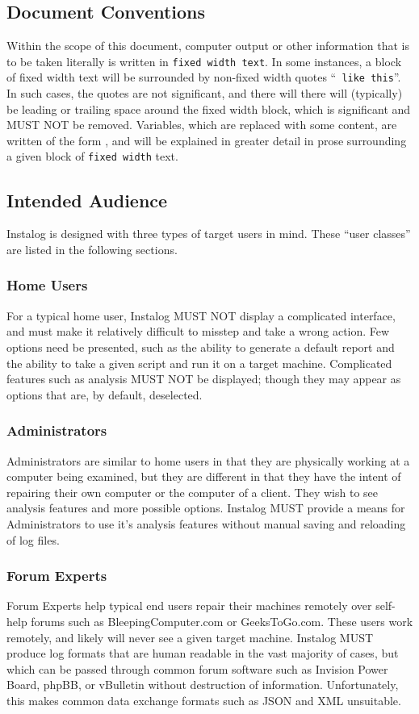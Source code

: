 \subsection{Document Conventions}
Within the scope of this document, computer output or other information that is
to be taken literally is written in \texttt{fixed width text}. In some
instances, a block of fixed width text will be surrounded by non-fixed width
quotes ``\texttt{ like this}''. In such cases, the quotes are not significant,
and there will there will (typically) be leading or trailing space around the
fixed width block, which is significant and MUST NOT be removed. Variables,
which are replaced with some content, are written of the form , and
will be explained in greater detail in prose surrounding a given block of
\texttt{fixed width} text.

\subsection{Intended Audience}
Instalog is designed with three types of target users in mind. These ``user
classes'' are listed in the following sections.

\subsubsection{Home Users}
For a typical home user, Instalog MUST NOT display a complicated interface, and
must make it relatively difficult to misstep and take a wrong action. Few
options need be presented, such as the ability to generate a default report and
the ability to take a given script and run it on a target machine. Complicated
features such as analysis MUST NOT be displayed; though they may appear as
options that are, by default, deselected.

\subsubsection{Administrators}
Administrators are similar to home users in that they are physically working at
a computer being examined, but they are different in that they have the intent of
repairing their own computer or the computer of a client. They wish to see
analysis features and more possible options. Instalog MUST provide a means for
Administrators to use it's analysis features without manual saving and reloading
of log files.

\subsubsection{Forum Experts}
Forum Experts help typical end users repair their machines remotely over
self-help forums such as BleepingComputer.com or GeeksToGo.com.
These users work remotely, and likely will never see a given target
machine.
Instalog MUST produce log formats that are human readable in the vast majority
of cases, but which can be passed through common forum software such as Invision
Power Board, phpBB, or vBulletin without destruction of information.
Unfortunately, this makes common data exchange formats such as JSON and XML
unsuitable. 

